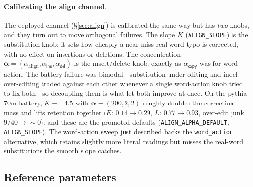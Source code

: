 \documentclass[11pt]{article}
\providecommand{\copyact}{\textsf{copy}}
\providecommand{\insact}{\textsf{ins}}
\providecommand{\delact}{\textsf{del}}
\providecommand{\code}[1]{\texttt{#1}}
\begin{document}
\paragraph{Calibrating the align channel.} The deployed channel (\S\ref{sec:align}) is calibrated the same way but has \emph{two} knobs, and they turn out to move orthogonal failures. The slope $K$ (\code{ALIGN\_SLOPE}) is the substitution knob: it sets how cheaply a near-miss real-word typo is corrected, with no effect on insertions or deletions. The concentration $\bm\alpha = (\alpha_{\mathrm{align}}, \alpha_{\insact}, \alpha_{\delact})$ is the insert/delete knob, exactly as $\alpha_{\copyact}$ was for word-action. The battery failure was bimodal---substitution under-editing and indel over-editing traded against each other whenever a single word-action knob tried to fix both---so decoupling them is what let both improve at once. On the pythia-70m battery, $K=-4.5$ with $\bm\alpha=(200,2,2)$ roughly doubles the correction mass and lifts retention together ($E\!:\,0.14\!\to\!0.29$, $L\!:\,0.77\!\to\!0.93$, over-edit junk $9/40\!\to\!\sim\!0$), and these are the promoted defaults (\code{ALIGN\_ALPHA\_DEFAULT}, \code{ALIGN\_SLOPE}). The word-action sweep just described backs the \code{word\_action} alternative, which retains slightly more literal readings but misses the real-word substitutions the smooth slope catches.

\subsection{Reference parameters}
\label{sec:params}
\end{document}
